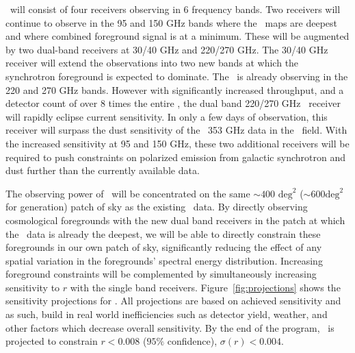 \documentclass[]{spie}
\begin{document}
\biceparray\ will consist of four receivers observing in 6 frequency bands.
Two receivers will continue to observe in the 95 and 150 GHz bands where the
\bk\ maps are deepest and where combined foreground signal is at a minimum.
These will be augmented by two dual-band receivers at 30/40 GHz and 220/270
GHz.  The 30/40 GHz receiver will extend the observations into two new bands at
which the synchrotron foreground is expected to dominate. The \keckarray\ is
already observing in the 220 and 270 GHz bands.  However with significantly
increased throughput, and a detector count of over 8 times the entire
\keckarray, the dual band 220/270 GHz \biceparray\ receiver will rapidly
eclipse current sensitivity. In only a few days of observation, this receiver
will surpass the dust sensitivity of the \planck\ 353 GHz data in the \bk\
field. With the increased sensitivity at 95 and 150 GHz, these two additional
receivers will be required to push constraints on polarized emission from
galactic synchrotron and dust further than the currently available data.





The observing power of \biceparray\ will be concentrated on the same $\sim400
\text{ deg}^2$ ($\sim 600 \text{deg}^2$ for \bicep3 generation) patch of sky as the existing \bk\ data. By directly
observing cosmological foregrounds with the new dual band receivers in the
patch at which the \bk\ data is already the deepest, we will be able to
directly constrain these foregrounds in our own patch of sky, significantly
reducing the effect of any spatial variation in the foregrounds' spectral
energy distribution. Increasing foreground constraints will be complemented by
simultaneously increasing sensitivity to $r$ with the single band receivers.
Figure~\ref{fig:projections} shows the sensitivity projections for \biceparray.
All projections are based on achieved sensitivity and as such, build in real
world inefficiencies such as detector yield, weather, and other factors which
decrease overall sensitivity. By the end of the program, \biceparray\ is
projected to constrain $r<0.008$ ($95\%$ confidence), $\sigma (r)<0.004$.
\end{document}
